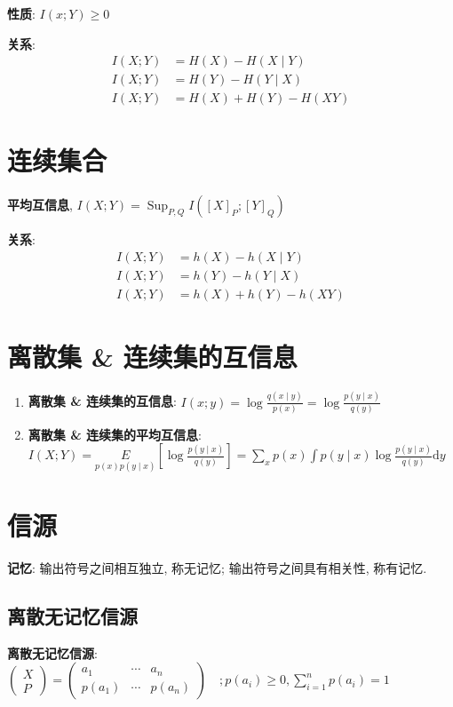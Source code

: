 \documentclass{article}
\newcommand{\env}[2]{\begin{#1}#2\end{#1}}
\newcommand{\defi}[2]{\textbf{#1}, #2}
\begin{document}
                \textbf{性质}: $I(x ; Y) \ge 0$
                
                \textbf{关系}: 
                    \env{align*}{
                        I(X ; Y) &= H(X)-H(X \mid Y) \\
                        I(X ; Y) &= H(Y)-H(Y \mid X) \\
                        I(X ; Y) &= H(X)+H(Y)-H(X Y)
                    }
             
            \section{连续集合}
                \defi{平均互信息}{$I(X ; Y)=\operatorname{Sup}_{P, Q} I\left([X]_{P} ;[Y]_{Q}\right)$}
                
                \textbf{关系}:
                    \env{align*}{
                        I(X ; Y) &= h(X)-h(X \mid Y) \\
                        I(X ; Y) &= h(Y)-h(Y \mid X) \\
                        I(X ; Y) &= h(X)+h(Y)-h(X Y)
                    }
                    
            \section{离散集 \& 连续集的互信息}
                \env{enumerate}{
                    \item \textbf{离散集 \& 连续集的互信息}: $I(x ; y)=\log \frac{q(x \mid y)}{p(x)}=\log \frac{p(y \mid x)}{q(y)}$
                    \item \textbf{离散集 \& 连续集的平均互信息}: $I(X ; Y)=\underset{p(x) p(y \mid x)}{E}\left[\log \frac{p(y \mid x)}{q(y)}\right]=\sum_{x} p(x) \int p(y \mid x) \log \frac{p(y \mid x)}{q(y)} \mathrm{d} y$
                }
            
            
\section{信源}

    \textbf{记忆}: 输出符号之间相互独立, 称无记忆; 输出符号之间具有相关性, 称有记忆.
    
    \subsection{离散无记忆信源}
        \textbf{离散无记忆信源}:  $ \left(\begin{array}{l} X \\ P \end{array}\right)
                 = \left(\begin{array}{lll}
                    a_{1} & \cdots & a_{n} \\ p\left(a_{1}\right) & \cdots & p\left(a_{n}\right)
                \end{array}\right) \quad;
                p\left(a_{i}\right) \geqslant 0, \sum_{i=1}^{n} p\left(a_{i}\right)=1$
                
\end{document}

